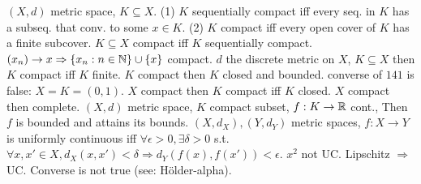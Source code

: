  $(X, d)$ metric space, $K \subseteq X$.
(1) $K$ sequentially compact iff every seq. in $K$ has a subseq. that conv. to some $x \in K$.
(2) $K$ compact iff every open cover of $K$ has a finite subcover.
\wt{} $K \subseteq X$ compact iff $K$ sequentially compact.
 $(x_n) \to x \Rightarrow \{x_n : n \in \mathbb{N}\} \cup \{x\}$ compact.
 $d$ the discrete metric on $X$, $K \subseteq X$ then $K$ compact iff $K$ finite.
 $K$ compact then $K$ closed and bounded.
 converse of $141$ is false: $X = K = (0,1)$.
 $X$ compact then $K$ compact iff $K$ closed.
 $X$ compact then complete.
 $(X,d)$ metric space, $K$ compact subset, $f: K \to \mathbb{R}$ cont.,
Then $f$ is bounded and attains its bounds.
 $(X,d_X), (Y,d_Y)$ metric spaces,
$f: X \to Y$ is uniformly continuous iff $\forall \epsilon > 0, \exists \delta > 0$ s.t.
$\forall x, x' \in X, d_X(x, x') < \delta \Rightarrow d_Y(f(x), f(x')) < \epsilon$.
 $x^2$ not UC.
 Lipschitz $\Rightarrow$ UC.
Converse is not true (see: Hölder-alpha).
